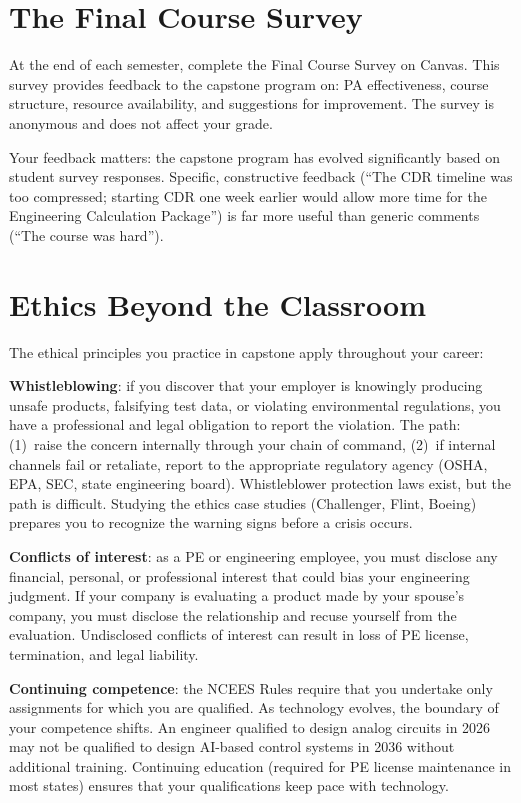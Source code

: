 \section{The Final Course Survey}
At the end of each semester, complete the Final Course Survey on Canvas. This survey provides feedback to the capstone program on: PA effectiveness, course structure, resource availability, and suggestions for improvement. The survey is anonymous and does not affect your grade.

Your feedback matters: the capstone program has evolved significantly based on student survey responses. Specific, constructive feedback (``The CDR timeline was too compressed; starting CDR one week earlier would allow more time for the Engineering Calculation Package'') is far more useful than generic comments (``The course was hard'').





\section{Ethics Beyond the Classroom}
The ethical principles you practice in capstone apply throughout your career:

\textbf{Whistleblowing}: if you discover that your employer is knowingly producing unsafe products, falsifying test data, or violating environmental regulations, you have a professional and legal obligation to report the violation. The path: (1)~raise the concern internally through your chain of command, (2)~if internal channels fail or retaliate, report to the appropriate regulatory agency (OSHA, EPA, SEC, state engineering board). Whistleblower protection laws exist, but the path is difficult. Studying the ethics case studies (Challenger, Flint, Boeing) prepares you to recognize the warning signs before a crisis occurs.

\textbf{Conflicts of interest}: as a PE or engineering employee, you must disclose any financial, personal, or professional interest that could bias your engineering judgment. If your company is evaluating a product made by your spouse's company, you must disclose the relationship and recuse yourself from the evaluation. Undisclosed conflicts of interest can result in loss of PE license, termination, and legal liability.

\textbf{Continuing competence}: the NCEES Rules require that you undertake only assignments for which you are qualified. As technology evolves, the boundary of your competence shifts. An engineer qualified to design analog circuits in 2026 may not be qualified to design AI-based control systems in 2036 without additional training. Continuing education (required for PE license maintenance in most states) ensures that your qualifications keep pace with technology.

